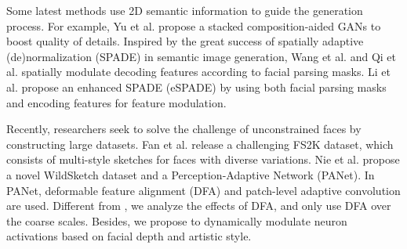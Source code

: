 \documentclass[10pt,twocolumn,letterpaper]{article}
\begin{document}
Some latest methods use 2D semantic information to guide the generation process. For example, Yu et al. \cite{gao2020cagan} propose a stacked composition-aided GANs to boost quality of details. Inspired by the great success of spatially adaptive (de)normalization (SPADE)  \cite{Park2019GauGAN} in semantic image generation, Wang et al. \cite{zhu2021sketch} and Qi et al. \cite{qi2022biphasic} spatially modulate decoding features according to facial parsing masks. Li et al. \cite{li2021genre} propose an enhanced SPADE (eSPADE) by using both facial parsing masks and encoding features for feature modulation. 

Recently, researchers seek to solve the challenge of unconstrained faces by constructing large datasets. Fan et al. \cite{Fan2021FS2K} release a challenging FS2K dataset, which consists of multi-style sketches for faces with diverse variations. %
Nie et al. \cite{nie2021unconstrained} propose a novel WildSketch dataset and a Perception-Adaptive Network (PANet). In PANet, deformable feature alignment (DFA) and patch-level adaptive convolution are used. Different from \cite{nie2021unconstrained}, we analyze the effects of DFA, and only use DFA over the coarse scales. Besides, we propose to dynamically modulate neuron activations based on facial depth and artistic style.


\end{document}
